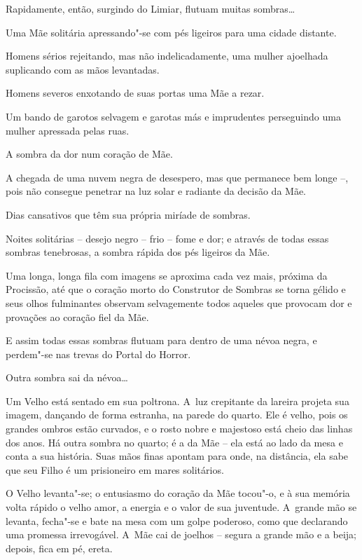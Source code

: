 \smallskip
Rapidamente, então, surgindo do Limiar, flutuam muitas sombras\ldots{}

\smallskip
Uma Mãe solitária apressando"-se com pés ligeiros para uma cidade
distante.

\smallskip
Homens sérios rejeitando, mas não indelicadamente, uma mulher ajoelhada
suplicando com as mãos levantadas.

\smallskip
Homens severos enxotando de suas portas uma Mãe a rezar.

\smallskip
Um bando de garotos selvagem e garotas más e imprudentes perseguindo
uma mulher apressada pelas ruas.

\smallskip
A sombra da dor num coração de Mãe.

\smallskip
A chegada de uma nuvem negra de desespero, mas que permanece bem longe \mbox{--,}
pois não consegue penetrar na luz solar e radiante da decisão da Mãe.

\smallskip
Dias cansativos que têm sua própria miríade de sombras.

\smallskip
Noites solitárias -- desejo negro -- frio -- fome e dor; e através de
todas essas sombras tenebrosas, a sombra rápida dos pés ligeiros da Mãe.

\smallskip
Uma longa, longa fila com imagens se aproxima cada vez mais,
próxima da Procissão, até que o coração morto do Construtor de Sombras se
torna gélido e seus olhos fulminantes observam selvagemente todos
aqueles que provocam dor e provações ao coração fiel da Mãe.

E assim todas essas sombras flutuam para dentro de uma névoa negra, e
perdem"-se nas trevas do Portal do Horror.

\smallskip
Outra sombra sai da névoa\ldots{}

Um Velho está sentado em sua poltrona. A~luz crepitante da lareira
projeta sua imagem, dançando de forma estranha, na parede do quarto. Ele
é velho, pois os grandes ombros estão curvados, e o rosto nobre e
majestoso está cheio das linhas dos anos. Há outra sombra no
quarto; é a da Mãe -- ela está ao lado da mesa e conta a sua
história. Suas mãos finas apontam para onde, na distância, ela sabe que seu
Filho é um prisioneiro em mares solitários.

O Velho levanta"-se; o entusiasmo do coração da Mãe tocou"-o, e à sua
memória volta rápido o velho amor, a energia e o valor de sua
juventude. A~grande mão se levanta, fecha"-se e bate na mesa com um golpe
poderoso, como que declarando uma promessa irrevogável. A~Mãe cai de
joelhos -- segura a grande mão e a beija; depois, fica em pé, ereta.

